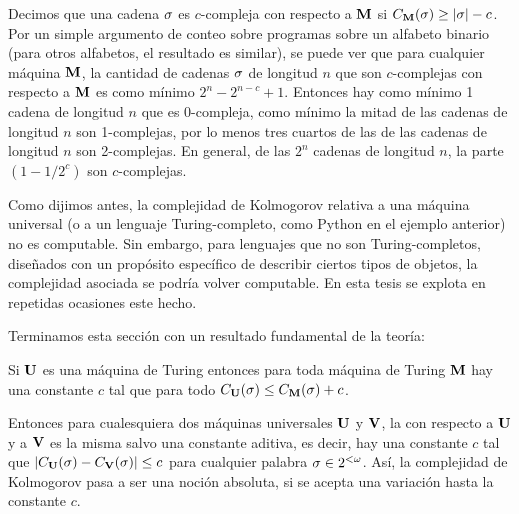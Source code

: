 

Decimos que una cadena $\sigma$ es $c$-compleja con respecto a ${\bf M}$ si $C_{{\bf M}}(\sigma)\geq |\sigma|-c$. Por un simple argumento de conteo sobre programas sobre un alfabeto binario (para otros alfabetos, el resultado es similar), se puede ver que para cualquier máquina ${\bf M}$, la cantidad de cadenas $\sigma$ de longitud $n$ que son $c$-complejas con respecto a ${\bf M}$ es como mínimo $2^n-2^{n-c}+1$. Entonces hay como mínimo 1 cadena de longitud $n$ que es 0-compleja, como mínimo la mitad de las cadenas de longitud $n$ son 1-complejas, por lo menos tres cuartos de las de las cadenas de longitud $n$ son 2-complejas. En general, de las $2^n$ cadenas de longitud $n$, la parte $(1-1/2^c)$ son $c$-complejas.


Como dijimos antes, la complejidad de Kolmogorov relativa a una máquina universal (o a un lenguaje Turing-completo, como Python en el ejemplo anterior) no es computable. Sin embargo, para lenguajes que no son Turing-completos, diseñados con un propósito específico de describir ciertos tipos de objetos, la complejidad asociada se podría volver computable. En esta tesis se explota en repetidas ocasiones este hecho.

Terminamos esta sección con un resultado fundamental de la teoría:
%
\begin{teorema}[Invariancia]\label{intro:thm:invariance}
 Si ${\bf U}$ es una máquina de Turing \opt entonces para toda máquina de Turing ${\bf M}$ hay una constante $c$ tal que para todo
$C_{{\bf U}}(\sigma)\leq C_{{\bf M}}(\sigma)+c$.
\end{teorema}
%
Entonces para cualesquiera dos máquinas universales ${\bf U}$ y ${\bf V}$, la
\kolcomp con respecto a ${\bf U}$ y a ${\bf V}$ es la misma salvo una constante aditiva, es decir, hay una constante  $c$ tal que 
$\left| C_{{\bf U}}(\sigma)-C_{{\bf V}}(\sigma) \right|\leq c$ para cualquier palabra $\sigma\in2^{<\omega}$. Así, la complejidad de Kolmogorov pasa a ser una noción absoluta, si se acepta una variación hasta la constante $c$. 

